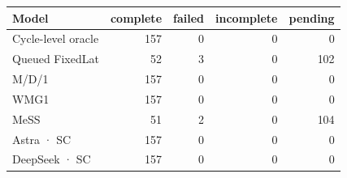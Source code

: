 \begin{tabular}{lrrrr}
\toprule
Model & complete & failed & incomplete & pending \\
\midrule
Cycle-level oracle & 157 & 0 & 0 & 0 \\
Queued FixedLat & 52 & 3 & 0 & 102 \\
M/D/1 & 157 & 0 & 0 & 0 \\
WMG1 & 157 & 0 & 0 & 0 \\
MeSS & 51 & 2 & 0 & 104 \\
Astra · SC & 157 & 0 & 0 & 0 \\
DeepSeek · SC & 157 & 0 & 0 & 0 \\
\bottomrule
\end{tabular}
